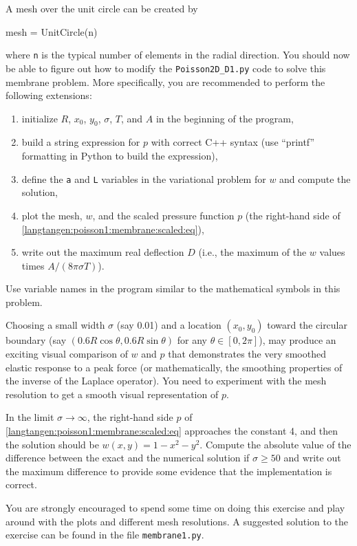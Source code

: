 A mesh over the unit circle can be created
by
\begin{python}
mesh = UnitCircle(n)
\end{python}
where {\fontsize{10pt}{10pt}\texttt{n}} is the typical number of elements in the radial direction.
You should now be able to figure out how to modify the
{\fontsize{10pt}{10pt}\verb!Poisson2D_D1.py!} code to solve this membrane problem.
More specifically, you are recommended to perform the following extensions:
\begin{enumerate}
\item  initialize $R$, $x_0$, $y_0$, $\sigma$, $T$, and $A$ in the 
beginning of the program, 
\item
build a string expression for $p$ with correct C++ syntax
(use ``printf'' formatting in Python to build the expression),
\item
define the {\fontsize{10pt}{10pt}\texttt{a}} and {\fontsize{10pt}{10pt}\texttt{L}} variables in the variational problem for 
$w$ and compute the solution, 
\item plot the mesh,
$w$, and the scaled pressure function $p$ (the right-hand side of
\eqref{langtangen:poisson1:membrane:scaled:eq}),
\item write out the maximum real deflection $D$
(i.e., the maximum of the $w$ values times $A/(8\pi\sigma T)$).
\end{enumerate}
Use variable names in the program similar to the mathematical symbols
in this problem.

Choosing a small width $\sigma$ (say 0.01)
and a location $(x_0,y_0)$ toward the circular boundary
(say $(0.6R\cos\theta, 0.6R\sin\theta)$ for any $\theta\in [0,2\pi]$),
may produce an exciting visual comparison of $w$ and $p$ that 
demonstrates the very smoothed elastic response to a peak force
(or mathematically, the smoothing properties of the inverse of the
Laplace operator).
You need to experiment with the mesh resolution to get a smooth
visual representation of $p$.

In the limit $\sigma\rightarrow\infty$, the right-hand side $p$ of
\eqref{langtangen:poisson1:membrane:scaled:eq} approaches the constant 4,
and then the solution should be $w(x,y) = 1-x^2-y^2$.
Compute the absolute value of the
difference between the exact and the numerical solution
if $\sigma \geq 50$ and write out the maximum difference
to provide some evidence that the implementation is correct.

You are strongly encouraged to spend some time on doing 
this exercise and play around with
the plots and different mesh resolutions. 
A suggested solution to the exercise
can be found in the file {\fontsize{10pt}{10pt}\texttt{membrane1.py}}.



